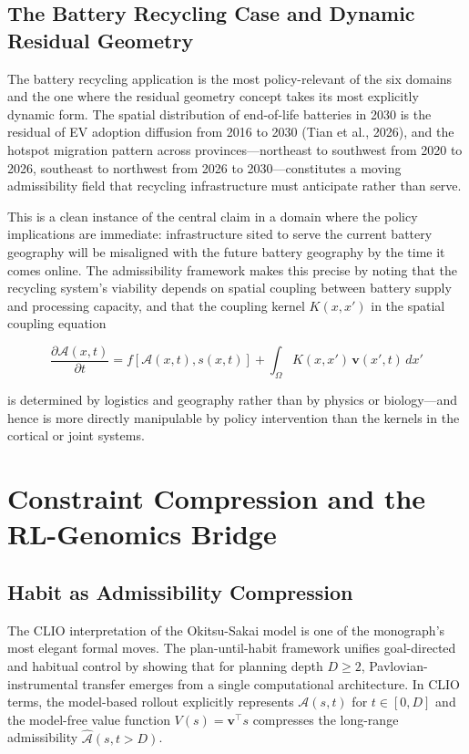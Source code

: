 \documentclass[12pt, a4paper]{article}
\theoremstyle{definition}
\begin{document}
\subsection{The Battery Recycling Case and Dynamic Residual Geometry}

The battery recycling application is the most policy-relevant of the six domains and the one where the residual geometry concept takes its most explicitly dynamic form. The spatial distribution of end-of-life batteries in 2030 is the residual of EV adoption diffusion from 2016 to 2030 (Tian et al., 2026), and the hotspot migration pattern across provinces---northeast to southwest from 2020 to 2026, southeast to northwest from 2026 to 2030---constitutes a moving admissibility field that recycling infrastructure must anticipate rather than serve.

This is a clean instance of the central claim in a domain where the policy implications are immediate: infrastructure sited to serve the current battery geography will be misaligned with the future battery geography by the time it comes online. The admissibility framework makes this precise by noting that the recycling system's viability depends on spatial coupling between battery supply and processing capacity, and that the coupling kernel $K(x,x')$ in the spatial coupling equation

\begin{equation}
\frac{\partial \mathcal{A}(x,t)}{\partial t} = f[\mathcal{A}(x,t), s(x,t)] + \int_\Omega K(x,x')\, \mathbf{v}(x',t)\, dx'
\end{equation}

is determined by logistics and geography rather than by physics or biology---and hence is more directly manipulable by policy intervention than the kernels in the cortical or joint systems.

\section{Constraint Compression and the RL-Genomics Bridge}

\subsection{Habit as Admissibility Compression}

The CLIO interpretation of the Okitsu-Sakai model is one of the monograph's most elegant formal moves. The plan-until-habit framework unifies goal-directed and habitual control by showing that for planning depth $D \geq 2$, Pavlovian-instrumental transfer emerges from a single computational architecture. In CLIO terms, the model-based rollout explicitly represents $\mathcal{A}(s,t)$ for $t \in [0,D]$ and the model-free value function $V(s) = \mathbf{v}^\top s$ compresses the long-range admissibility $\hat{\mathcal{A}}(s,t > D)$.
\end{document}
